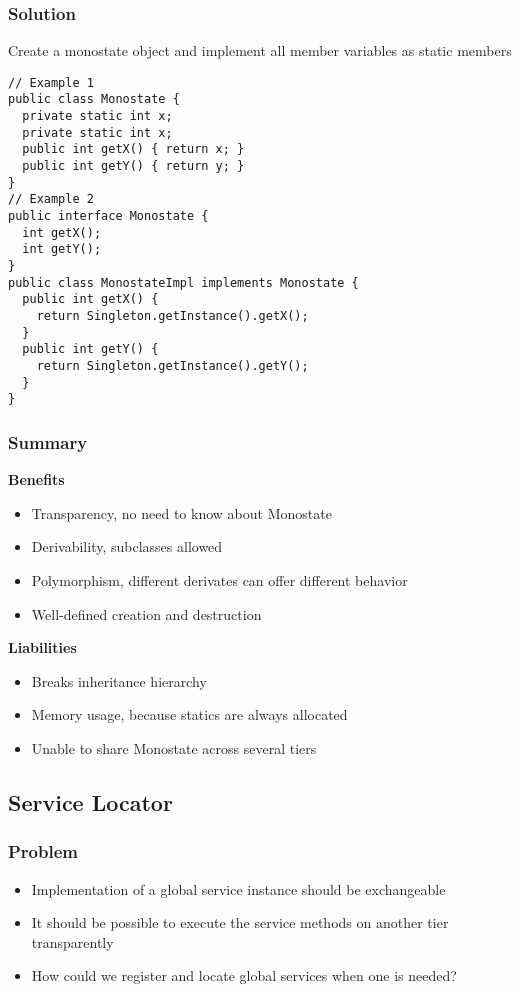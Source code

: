 \subsubsection{Solution}
Create a monostate object and implement all member variables as static members 
\begin{lstlisting}[style=htmlcssjs]
// Example 1
public class Monostate {
  private static int x;
  private static int x;
  public int getX() { return x; }
  public int getY() { return y; }
}
// Example 2
public interface Monostate {
  int getX();
  int getY();
}
public class MonostateImpl implements Monostate {
  public int getX() {
    return Singleton.getInstance().getX();
  }
  public int getY() {
    return Singleton.getInstance().getY();
  }
}
\end{lstlisting}
\subsubsection{Summary}
\textbf{Benefits}
\begin{itemize}[topsep=0pt]
    \itemsep -0.4em
    \item Transparency, no need to know about Monostate
    \item Derivability, subclasses allowed
    \item Polymorphism, different derivates can offer different behavior
    \item Well-defined creation and destruction
\end{itemize}
\textbf{Liabilities}
\begin{itemize}[topsep=0pt]
    \itemsep -0.4em
    \item Breaks inheritance hierarchy
    \item Memory usage, because statics are always allocated
    \item Unable to share Monostate across several tiers
\end{itemize}

\subsection{Service Locator}
\subsubsection{Problem}
\begin{itemize}[topsep=0pt]
    \itemsep -0.4em
    \item Implementation of a global service instance should be exchangeable
    \item It should be possible to execute the service methods on another tier transparently
    \item How could we register and locate global services when one is needed?
\end{itemize}
